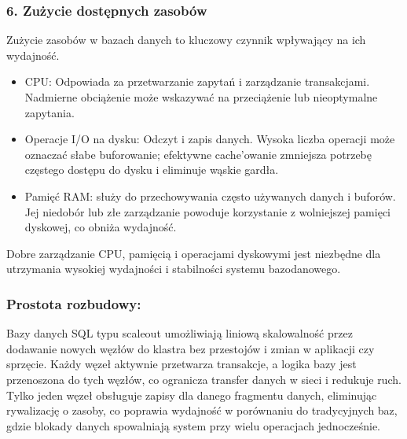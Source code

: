 \documentclass[letterpaper,10pt,polish]{sphinxmanual}
\begin{document}
\subsubsection{6. Zużycie dostępnych zasobów}
\label{\detokenize{rozdzial2/Wydajnosc_Skalowanie_i_Replikacja/index:zuzycie-dostepnych-zasobow}}
\sphinxAtStartPar
Zużycie zasobów w bazach danych to kluczowy czynnik wpływający na ich wydajność.
\begin{description}
\begin{itemize}
\item {} 
\sphinxAtStartPar
CPU: Odpowiada za przetwarzanie zapytań i zarządzanie transakcjami. Nadmierne obciążenie może wskazywać na przeciążenie lub nieoptymalne zapytania.

\item {} 
\sphinxAtStartPar
Operacje I/O na dysku: Odczyt i zapis danych. Wysoka liczba operacji może oznaczać słabe buforowanie; efektywne cache’owanie zmniejsza potrzebę częstego dostępu do dysku i eliminuje wąskie gardła.

\item {} 
\sphinxAtStartPar
Pamięć RAM: służy do przechowywania często używanych danych i buforów. Jej niedobór lub złe zarządzanie powoduje korzystanie z wolniejszej pamięci dyskowej, co obniża wydajność.

\end{itemize}

\end{description}

\sphinxAtStartPar
Dobre zarządzanie CPU, pamięcią i operacjami dyskowymi jest niezbędne dla utrzymania wysokiej wydajności i stabilności systemu bazodanowego.


\subsubsection{Prostota rozbudowy:}
\label{\detokenize{rozdzial2/Wydajnosc_Skalowanie_i_Replikacja/index:prostota-rozbudowy}}
\sphinxAtStartPar
Bazy danych SQL typu scale\sphinxhyphen{}out umożliwiają liniową skalowalność przez dodawanie nowych węzłów do klastra bez przestojów i zmian w aplikacji czy sprzęcie. Każdy węzeł aktywnie przetwarza transakcje, a logika bazy jest przenoszona do tych węzłów, co ogranicza transfer danych w sieci i redukuje ruch. Tylko jeden węzeł obsługuje zapisy dla danego fragmentu danych, eliminując rywalizację o zasoby, co poprawia wydajność w porównaniu do tradycyjnych baz, gdzie blokady danych spowalniają system przy wielu operacjach jednocześnie.
\end{document}
